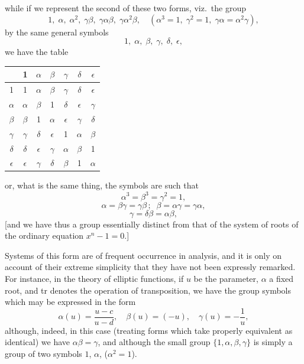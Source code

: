 \documentclass[11pt,a4paper]{book}
\begin{document}
\medskip

while if we represent the second of these two forms, viz.\ the group
\[
1,\;\alpha,\;\alpha^2,\;\gamma\beta,\;\gamma\alpha\beta,\;\gamma\alpha^2\beta,\quad(\alpha^3=1,\;\gamma^2=1,\;\gamma\alpha=\alpha^2\gamma),
\]
by the same general symbols
\[
1,\;\alpha,\;\beta,\;\gamma,\;\delta,\;\epsilon,
\]
we have the table
\medskip
\begin{center}
\begin{tabular}{c|cccccc}
 & 1 & $\alpha$ & $\beta$ & $\gamma$ & $\delta$ & $\epsilon$ \\\hline
1 & 1 & $\alpha$ & $\beta$ & $\gamma$ & $\delta$ & $\epsilon$ \\
$\alpha$ & $\alpha$ & $\beta$ & 1 & $\delta$ & $\epsilon$ & $\gamma$ \\
$\beta$ & $\beta$ & 1 & $\alpha$ & $\epsilon$ & $\gamma$ & $\delta$ \\
$\gamma$ & $\gamma$ & $\delta$ & $\epsilon$ & 1 & $\alpha$ & $\beta$ \\
$\delta$ & $\delta$ & $\epsilon$ & $\gamma$ & $\alpha$ & $\beta$ & 1 \\
$\epsilon$ & $\epsilon$ & $\gamma$ & $\delta$ & $\beta$ & 1 & $\alpha$
\end{tabular}
\end{center}

\medskip

or, what is the same thing, the symbols are such that
\[
\alpha^3 = \beta^3 = \gamma^2 = 1,
\]
\[
\alpha = \beta\gamma = \gamma\beta\,;\;\;\beta = \alpha\gamma = \gamma\alpha,
\]
\[
\gamma = \delta\beta = \alpha\beta,
\]
[and we have thus a group essentially distinct from that of the system of roots of
the ordinary equation $x^n - 1 = 0$.]

Systems of this form are of frequent occurrence in analysis, and it is only on
account of their extreme simplicity that they have not been expressly remarked. For
instance, in the theory of elliptic functions, if $u$ be the parameter, $\alpha$ a fixed root, and tr
denotes the operation of transposition, we have the group symbols which may be expressed in the form
\[
\alpha(u) = \frac{u-c}{u-d},\quad\beta(u) = (-u),\quad\gamma(u) = -\frac{1}{u},
\]
although, indeed, in this case (treating forms which take properly equivalent as identical)
we have $\alpha\beta = \gamma$, and although the small group $\{1,\alpha,\beta,\gamma\}$ is simply a
group of two symbols $1$, $\alpha$, ($\alpha^2 = 1$).

\medskip
\end{document}
